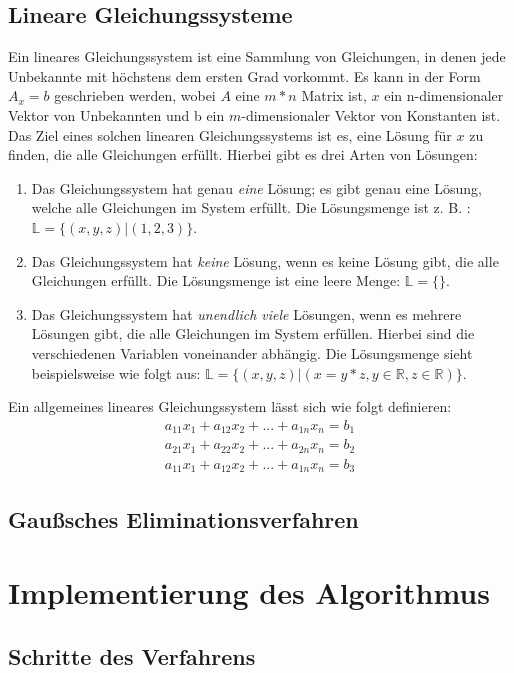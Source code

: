 \documentclass[a4paper, 12pt]{report}
\begin{document}
\begin{sloppypar}
\section{Lineare Gleichungssysteme}
Ein lineares Gleichungssystem ist eine Sammlung von Gleichungen, in denen jede Unbekannte mit höchstens dem ersten Grad vorkommt.
Es kann in der Form $ A_x = b $ geschrieben werden, wobei $A$ eine $ m * n $ Matrix ist, $x$ ein n-dimensionaler Vektor von Unbekannten
und b ein $m$-dimensionaler Vektor von Konstanten ist.
Das Ziel eines solchen linearen Gleichungssystems ist es, eine Lösung für $x$ zu finden, die alle Gleichungen erfüllt.
Hierbei gibt es drei Arten von Lösungen:
\begin{enumerate}
    \item Das Gleichungssystem hat genau \textit{eine} Lösung; es gibt genau eine Lösung, welche alle Gleichungen im System erfüllt. Die Lösungsmenge ist z. B. : $\mathbb{L} = \{ (x,y,z)| (1,2,3)\} $.
    \item Das Gleichungssystem hat \textit{keine} Lösung, wenn es keine Lösung gibt, die alle Gleichungen erfüllt. Die Lösungsmenge ist eine leere Menge: $\mathbb{L} = \{ \}$.
    \item Das Gleichungssystem hat \textit{unendlich viele} Lösungen, wenn es mehrere Lösungen gibt, die alle Gleichungen im System erfüllen.
        Hierbei sind die verschiedenen Variablen voneinander abhängig. Die Lösungsmenge sieht beispielsweise wie folgt aus: \newline $ \mathbb{L} = \{(x, y, z)| (x = y * z, y\in \mathbb{R}, z \in \mathbb{R}) \} $.
\end{enumerate}
Ein allgemeines lineares Gleichungssystem lässt sich wie folgt definieren:  \autocite{gramlich2018}
\begin{align*}
    a_{11}x_{1}+ a_{12}x_{2}+...+ a_{1n}x_{n} = b_1 \\
    a_{21}x_{1}+ a_{22}x_{2}+...+ a_{2n}x_{n} = b_2\\
    a_{11}x_{1}+ a_{12}x_{2}+...+ a_{1n}x_{n} = b_3
\end{align*}
\section{Gaußsches Eliminationsverfahren}
\chapter{Implementierung des Algorithmus}
\section{Schritte des Verfahrens}

\end{sloppypar}
\end{document}
